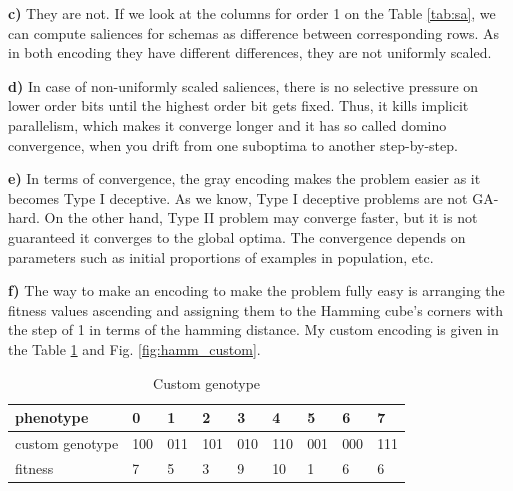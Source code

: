 \documentclass[12pt, a4paper]{article}
\begin{document}
        {\bf c)} They are not. If we look at the columns for order 1 on the Table \ref{tab:sa},
        we can compute saliences for schemas as difference between corresponding rows. As in
        both encoding they have different differences, they are not uniformly scaled.

        {\bf d)} In case of non-uniformly scaled saliences, there is no selective pressure
        on lower order bits until the highest order bit gets fixed. Thus, it kills implicit
        parallelism, which makes it converge longer and it has so called domino convergence,
        when you drift from one suboptima to another step-by-step.

        {\bf e)} In terms of convergence, the gray encoding makes the problem easier as it
        becomes Type I deceptive. As we know, Type I deceptive problems are not GA-hard.
        On the other hand, Type II problem may converge faster, but it is not guaranteed
        it converges to the global optima. The convergence depends on parameters such as
        initial proportions of examples in population, etc.

        {\bf f)} The way to make an encoding to make the problem fully easy is arranging
        the fitness values ascending and assigning them to the Hamming cube's corners with the step
        of 1 in terms of the hamming distance. My custom encoding is given in the Table
        \ref{tab:cust_gt} and Fig. \ref{fig:hamm_custom}.

        \begin{table}[H]
        \centering
        \caption{Custom genotype}
        \label{tab:cust_gt}
            \begin{tabular}{|l|llllllll|}
            \hline
            phenotype       & 0   & 1   & 2   & 3   & 4   & 5   & 6   & 7   \\ \hline
            custom genotype & 100 & 011 & 101 & 010 & 110 & 001 & 000 & 111 \\ \hline
            fitness         & 7   & 5   & 3   & 9   & 10  & 1   & 6   & 6   \\ \hline
            \end{tabular}
        \end{table}
\end{document}
